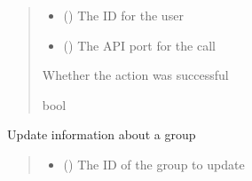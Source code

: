 \documentclass[letterpaper,10pt,english]{sphinxmanual}
\begin{document}
\begin{fulllineitems}
\begin{fulllineitems}
\begin{quote}
\begin{description}
\begin{itemize}
\item {} 
\sphinxAtStartPar
{} () \textendash{} The ID for the user

\item {} 
\sphinxAtStartPar
{} (\sphinxstyleliteralemphasis{\sphinxupquote{ (}}\sphinxstyleliteralemphasis{\sphinxupquote{)}}) \textendash{} The API port for the call

\end{itemize}

\sphinxAtStartPar
{} \textendash{} Whether the action was successful

\sphinxAtStartPar
bool

\end{description}\end{quote}

\end{fulllineitems}


\begin{fulllineitems}
\label{\detokenize{aisquared.platform:aisquared.platform.AISquaredPlatformClient.AISquaredPlatformClient.update_group}}
\pysigstartsignatures
{}
\pysigstopsignatures
\sphinxAtStartPar
Update information about a group
\begin{quote}\begin{description}
\begin{itemize}
\item {} 
\sphinxAtStartPar
{} () \textendash{} The ID of the group to update


\end{itemize}
\end{description}
\end{quote}
\end{fulllineitems}
\end{fulllineitems}
\end{document}
